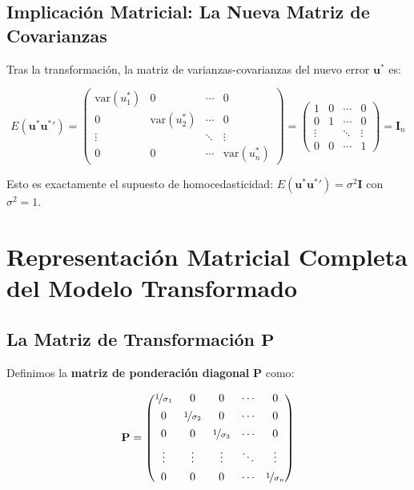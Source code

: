 \documentclass[12pt,a4paper]{article}
\begin{document}
\subsection{Implicación Matricial: La Nueva Matriz de Covarianzas}

Tras la transformación, la matriz de varianzas-covarianzas del nuevo error $\mathbf{u}^*$ es:

\begin{equation}
E(\mathbf{u}^* {\mathbf{u}^*}') =
\begin{pmatrix}
\text{var}(u_1^*) & 0 & \cdots & 0 \\
0 & \text{var}(u_2^*) & \cdots & 0 \\
\vdots & & \ddots & \vdots \\
0 & 0 & \cdots & \text{var}(u_n^*)
\end{pmatrix}
=
\begin{pmatrix}
1 & 0 & \cdots & 0 \\
0 & 1 & \cdots & 0 \\
\vdots & & \ddots & \vdots \\
0 & 0 & \cdots & 1
\end{pmatrix}
= \mathbf{I}_n
\end{equation}

Esto es exactamente el supuesto de homocedasticidad: $E(\mathbf{u}^*{\mathbf{u}^*}') = \sigma^2 \mathbf{I}$ con $\sigma^2 = 1$.

\section{Representación Matricial Completa del Modelo Transformado}

\subsection{La Matriz de Transformación $\mathbf{P}$}

Definimos la \textbf{matriz de ponderación diagonal} $\mathbf{P}$ como:

\begin{equation}
\mathbf{P} =
\begin{pmatrix}
\nicefrac{1}{\sigma_1} & 0 & 0 & \cdots & 0 \\[4pt]
0 & \nicefrac{1}{\sigma_2} & 0 & \cdots & 0 \\[4pt]
0 & 0 & \nicefrac{1}{\sigma_3} & \cdots & 0 \\[4pt]
\vdots & \vdots & \vdots & \ddots & \vdots \\[4pt]
0 & 0 & 0 & \cdots & \nicefrac{1}{\sigma_n}
\end{pmatrix}
\end{equation}
\end{document}
